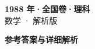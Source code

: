 \documentclass[zihao=-4, a4paper]{ctexart}
\begin{document}
\begin{center}
  {\Large\bfseries 1988 年·全国卷·理科}\\[4pt]
  {\large 数学 · 解析版}
\end{center}
\medskip
{}

\clearpage
{}
\begin{center}{\Large\bfseries 参考答案与详细解析}\end{center}
\medskip

\end{document}
